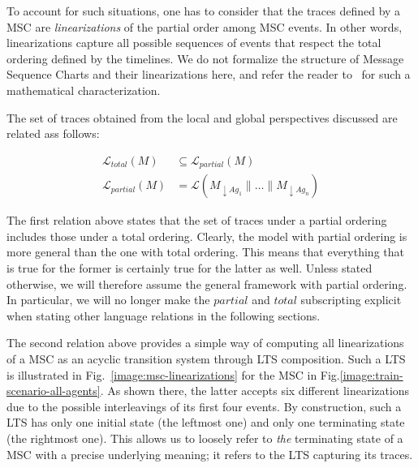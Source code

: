 To account for such situations, one has to consider that the traces defined by a MSC are \emph{linearizations} of the partial order among MSC events. In other words, linearizations capture all possible sequences of events that respect the total ordering defined by the timelines. We do not formalize the structure of Message Sequence Charts and their linearizations here, and refer the reader to~\cite{Uchitel:2003} for such a mathematical characterization. 

The set of traces obtained from the local and global perspectives discussed are related ass follows:

\vspace{-0.5cm}
\begin{align}
\mathcal{L}_{total}(M) & \subseteq \mathcal{L}_{partial}(M) \\
\mathcal{L}_{partial}(M) &= \mathcal{L}(M_{\downarrow Ag_1} \parallel \ldots \parallel M_{\downarrow Ag_n})
\label{equation:msc-composition}
\end{align}

The first relation above states that the set of traces under a partial ordering includes those under a total ordering. Clearly, the model with partial ordering is more general than the one with total ordering. This means that everything that is true for the former is certainly true for the latter as well. Unless stated otherwise, we will therefore assume the general framework with partial ordering. In particular, we will no longer make the $partial$ and $total$ subscripting explicit when stating other language relations in the following sections.

The second relation above provides a simple way of computing all linearizations of a MSC as an acyclic transition system through LTS composition. Such a LTS is illustrated in Fig.~\ref{image:msc-linearizations} for the MSC in Fig.\ref{image:train-scenario-all-agents}. As shown there, the latter accepts six different linearizations due to the possible interleavings of its first four events. By construction, such a LTS has only one initial state (the leftmost one) and only one terminating state (the rightmost one). This allows us to loosely refer to \emph{the} terminating state of a MSC with a precise underlying meaning; it refers to the LTS capturing its traces.


